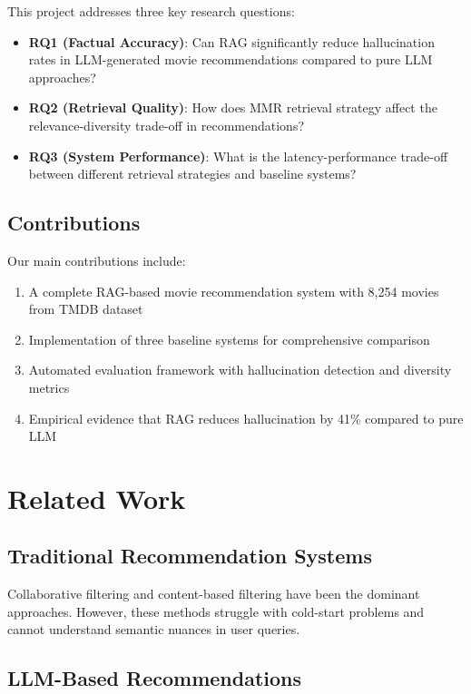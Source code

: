 \documentclass[11pt,a4paper]{article}
\begin{document}
This project addresses three key research questions:

\begin{itemize}
    \item \textbf{RQ1 (Factual Accuracy)}: Can RAG significantly reduce hallucination rates in LLM-generated movie recommendations compared to pure LLM approaches?
    \item \textbf{RQ2 (Retrieval Quality)}: How does MMR retrieval strategy affect the relevance-diversity trade-off in recommendations?
    \item \textbf{RQ3 (System Performance)}: What is the latency-performance trade-off between different retrieval strategies and baseline systems?
\end{itemize}

\subsection{Contributions}

Our main contributions include:

\begin{enumerate}
    \item A complete RAG-based movie recommendation system with 8,254 movies from TMDB dataset
    \item Implementation of three baseline systems for comprehensive comparison
    \item Automated evaluation framework with hallucination detection and diversity metrics
    \item Empirical evidence that RAG reduces hallucination by 41\% compared to pure LLM
\end{enumerate}

\section{Related Work}

\subsection{Traditional Recommendation Systems}

Collaborative filtering and content-based filtering have been the dominant approaches. However, these methods struggle with cold-start problems and cannot understand semantic nuances in user queries.

\subsection{LLM-Based Recommendations}
\end{document}
